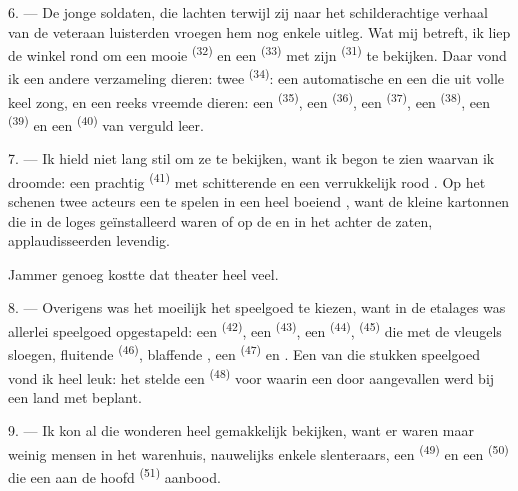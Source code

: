 6. --- De jonge soldaten, die lachten terwijl zij naar het schilderachtige verhaal van de
veteraan luisterden vroegen hem nog enkele uitleg. Wat mij betreft, ik liep de winkel rond om
een mooie  \textsuperscript{(32)} en een 
\textsuperscript{(33)} met zijn
 \textsuperscript{(31)} te bekijken. Daar vond ik een andere
verzameling dieren: twee  \textsuperscript{(34)}: een automatische
 en een  die uit volle keel zong, en een reeks vreemde
dieren: een  \textsuperscript{(35)}, een 
\textsuperscript{(36)}, een
 \textsuperscript{(37)}, een 
\textsuperscript{(38)}, een  \textsuperscript{(39)} en een
 \textsuperscript{(40)} van verguld leer.

7. --- Ik hield niet lang stil om ze te bekijken, want ik begon te zien waarvan ik droomde:
een prachtig  \textsuperscript{(41)} met schitterende  en
een verrukkelijk rood . Op het
 schenen twee acteurs een  te spelen in een heel
boeiend , want de kleine kartonnen  die in de loges
geïnstalleerd waren of op de  en in het
 achter de  zaten, applaudisseerden levendig.

Jammer genoeg kostte dat theater heel veel.

8. --- Overigens was het moeilijk het speelgoed te kiezen, want in de etalages was allerlei
speelgoed opgestapeld: een  \textsuperscript{(42)}, een 
\textsuperscript{(43)}, een
 \textsuperscript{(44)},  \textsuperscript{(45)}
die met de vleugels sloegen, fluitende  \textsuperscript{(46)}, blaffende
, een  \textsuperscript{(47)} en
. Een van die stukken speelgoed vond ik heel leuk:
het stelde een  \textsuperscript{(48)} voor waarin een
 door  aangevallen werd bij een land met
 beplant.


9. --- Ik kon al die wonderen heel gemakkelijk bekijken, want er waren maar weinig mensen in
het warenhuis, nauwelijks enkele slenteraars, een
 \textsuperscript{(49)} en een 
\textsuperscript{(50)} die een  aan de hoofd
\textsuperscript{(51)} aanbood.

